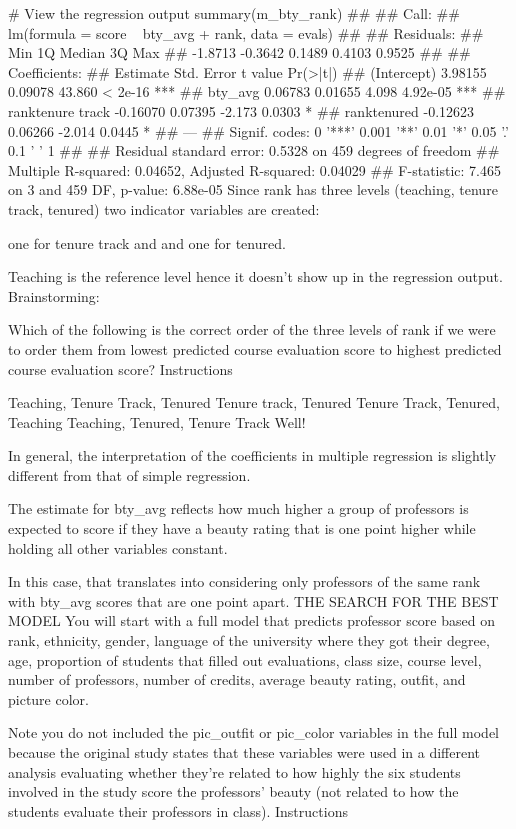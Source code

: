 # View the regression output
summary(m_bty_rank)
## 
## Call:
## lm(formula = score ~ bty_avg + rank, data = evals)
## 
## Residuals:
##     Min      1Q  Median      3Q     Max 
## -1.8713 -0.3642  0.1489  0.4103  0.9525 
## 
## Coefficients:
##                  Estimate Std. Error t value Pr(>|t|)    
## (Intercept)       3.98155    0.09078  43.860  < 2e-16 ***
## bty_avg           0.06783    0.01655   4.098 4.92e-05 ***
## ranktenure track -0.16070    0.07395  -2.173   0.0303 *  
## ranktenured      -0.12623    0.06266  -2.014   0.0445 *  
## ---
## Signif. codes:  0 '***' 0.001 '**' 0.01 '*' 0.05 '.' 0.1 ' ' 1
## 
## Residual standard error: 0.5328 on 459 degrees of freedom
## Multiple R-squared:  0.04652,    Adjusted R-squared:  0.04029 
## F-statistic: 7.465 on 3 and 459 DF,  p-value: 6.88e-05
Since rank has three levels (teaching, tenure track, tenured) two indicator variables 
are created: 

one for tenure track and and one for tenured. 

Teaching is the reference level hence it doesn't show up in the regression output.
Brainstorming:

Which of the following is the correct order of the three levels of rank if we were to 
order them from lowest predicted course evaluation score to highest predicted course 
evaluation score?
Instructions

Teaching, Tenure Track, Tenured
Tenure track, Tenured
Tenure Track, Tenured, Teaching
Teaching, Tenured, Tenure Track
Well!

In general, the interpretation of the coefficients in multiple regression is slightly 
different from that of simple regression. 

The estimate for bty_avg reflects how much higher a group of professors is expected to 
score if they have a beauty rating that is one point higher while holding all other 
variables constant. 

In this case, that translates into considering only professors of the same rank with 
bty_avg scores that are one point apart.
THE SEARCH FOR THE BEST MODEL
You will start with a full model that predicts professor score based on rank, ethnicity, 
gender, language of the university where they got their degree, age, proportion of students
that filled out evaluations, class size, course level, number of professors, number of 
credits, average beauty rating, outfit, and picture color.

Note you do not included the pic_outfit or pic_color variables in the full model because 
the original study states that these variables were used in a different analysis evaluating
whether they're related to how highly the six students involved in the study score the 
professors' beauty (not related to how the students evaluate their professors in class).
Instructions

